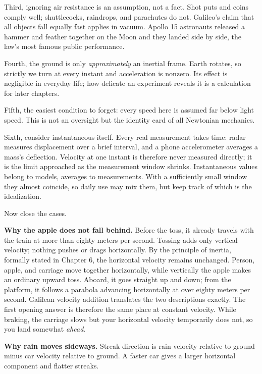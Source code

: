 Third, ignoring air resistance is an assumption, not a fact. Shot puts and coins comply well; shuttlecocks, raindrops, and parachutes do not. Galileo's claim that all objects fall equally fast applies in vacuum. Apollo 15 astronauts released a hammer and feather together on the Moon and they landed side by side, the law's most famous public performance.

Fourth, the ground is only \emph{approximately} an inertial frame. Earth rotates, so strictly we turn at every instant and acceleration is nonzero. Its effect is negligible in everyday life; how delicate an experiment reveals it is a calculation for later chapters.

Fifth, the easiest condition to forget: every speed here is assumed far below light speed. This is not an oversight but the identity card of all Newtonian mechanics.

Sixth, consider instantaneous itself. Every real measurement takes time: radar measures displacement over a brief interval, and a phone accelerometer averages a mass's deflection. Velocity at one instant is therefore never measured directly; it is the limit approached as the measurement window shrinks. Instantaneous values belong to models, averages to measurements. With a sufficiently small window they almost coincide, so daily use may mix them, but keep track of which is the idealization.


Now close the cases.

\textbf{Why the apple does not fall behind.} Before the toss, it already travels with the train at more than eighty meters per second. Tossing adds only vertical velocity; nothing pushes or drags horizontally. By the principle of inertia, formally stated in Chapter 6, the horizontal velocity remains unchanged. Person, apple, and carriage move together horizontally, while vertically the apple makes an ordinary upward toss. Aboard, it goes straight up and down; from the platform, it follows a parabola advancing horizontally at over eighty meters per second. Galilean velocity addition translates the two descriptions exactly. The first opening answer is therefore the same place at constant velocity. While braking, the carriage slows but your horizontal velocity temporarily does not, so you land somewhat \emph{ahead}.

\textbf{Why rain moves sideways.} Streak direction is rain velocity relative to ground minus car velocity relative to ground. A faster car gives a larger horizontal component and flatter streaks.

